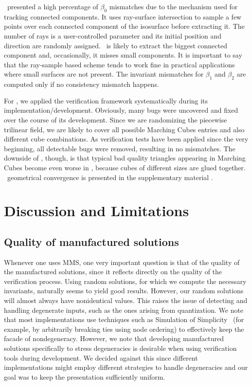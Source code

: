 \deliso\ presented a high percentage of $\beta_0$ mismatches due to the
mechanism used for tracking connected components. It uses ray-surface intersection to
sample a few points over each connected component of the isosurface before extracting it.
The number of rays is a user-controlled parameter and its initial position
and direction are randomly assigned. \deliso\ is likely to extract the biggest
connected component and, occasionally, it misses small components. It is
important to say that
the ray-sample based scheme tends to work fine in practical applications where
small
surfaces are not present. The invariant mismatches for $\beta_1$ and $\beta_2$
are computed only
if no consistency mismatch happens.

For \mcsimpleflow, we applied the verification
framework systematically during its implementation/development. Obviously, many
bugs were uncovered and fixed over the course of its development. 
Since we are randomizing the piecewise trilinear field, we are
likely to cover all possible Marching Cubes entries and also different
cube combinations. As verification tests have been applied since the very beginning,
all detectable bugs were removed, resulting in no mismatches. 
The downside of \mcsimpleflow, though, is that typical bad quality
triangles appearing in Marching Cubes become even worse in
\mcsimpleflow,
because cubes of different sizes are glued together. 
\mcsimpleflow\ geometrical
convergence is presented in the supplementary material
\cite{scheidegger:techreport:2010}.


\section{Discussion and Limitations}
\label{sec:discussion}

\subsection{Quality of manufactured solutions}
Whenever one uses MMS, one very important question is that of the quality
of the manufactured solutions, since it reflects directly on the
quality of the verification process. Using random solutions, for which
we compute the necessary invariants, naturally seems to yield good
results. However, our random solutions will almost always have
nonidentical values. This raises the issue of detecting and handling
degenerate inputs, such as the ones arising from quantization. We
note that most implementations use techniques such as Simulation of
Simplicity~\cite{Edelsbrunner:1990:SOS} (for example, by arbitrarily breaking ties using node
ordering) to effectively keep the facade of nondegeneracy. However, we note
that developing manufactured solutions
specifically to stress degeneracies is desirable when using
verification tools during development. We decided against this since
different implementations might employ different strategies to handle
degeneracies and our goal was to keep the presentation sufficiently
uniform.

